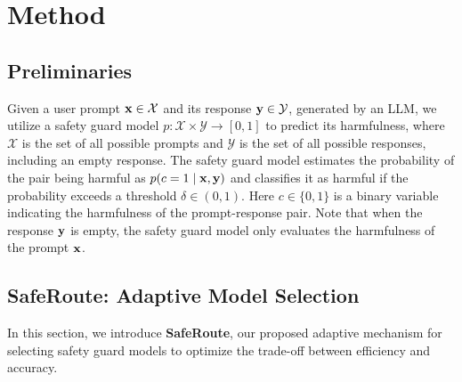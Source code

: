 \section{Method}
\label{sec:method}
\subsection{Preliminaries}
\label{sec:preliminaries}
Given a user prompt ${\mathbf{x}} \in \mathcal{X}$ and its response ${\mathbf{y}}\in\mathcal{Y}$, generated by an LLM, we utilize a safety guard model $p: \mathcal{X} \times \mathcal{Y} \to [0,1]$ to predict its harmfulness, where $\mathcal{X}$ is the set of all possible prompts and $\mathcal{Y}$ is the set of all possible responses, including an empty response. The safety guard model estimates the probability of the pair being harmful as $p(c=1\mid {\mathbf{x}}, {\mathbf{y}})$ and classifies it as harmful if the probability exceeds a threshold $\delta\in (0,1)$. Here $c\in\{0,1\}$ is a binary variable indicating the harmfulness of the prompt-response pair. Note that when the response  ${\mathbf{y}}$ is empty, the safety guard model only evaluates the harmfulness of the prompt ${\mathbf{x}}$.





\subsection{SafeRoute: Adaptive Model Selection}
\label{sec:adaptive_safety_guard_model_selection}
In this section, we introduce \textbf{SafeRoute}, our proposed adaptive mechanism for selecting safety guard models to optimize the trade-off between efficiency and accuracy.
